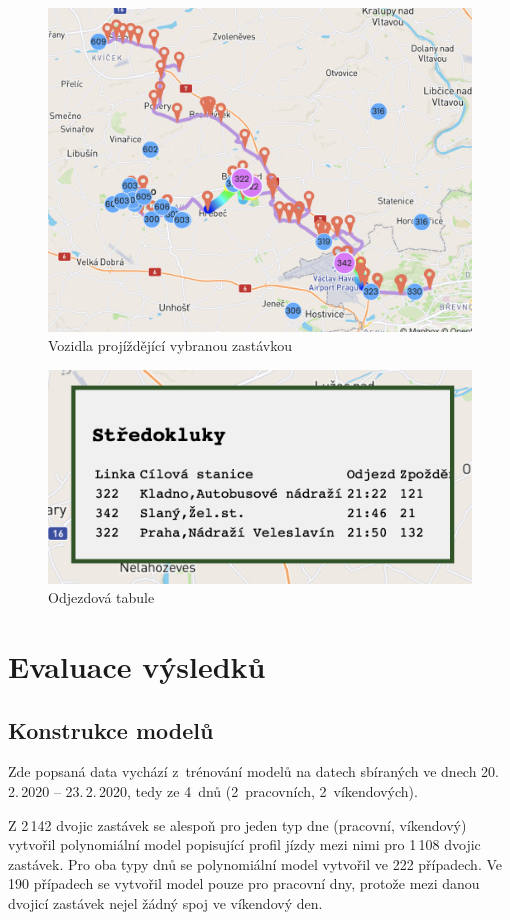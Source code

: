 \begin{figure}
   \centering
 \includegraphics[width=0.7\linewidth]{../img/more_trips.png}
 \caption{Vozidla projíždějící vybranou zastávkou}
 \label{fig:more_trips}
\end{figure}


\begin{figure}
   \centering
 \includegraphics[width=0.4\linewidth]{../img/stredokluky_table.png}
 \caption{Odjezdová tabule}
 \label{fig:stredokluky_table}
\end{figure}


\section{Evaluace výsledků}

\subsection{Konstrukce modelů}

Zde popsaná data vychází z~trénování modelů na datech sbíraných ve dnech 20.\,2.\,2020 -- 23.\,2.\,2020, tedy ze 4~dnů (2~pracovních, 2~víkendových).


\bigbreak

Z 2\,142 dvojic zastávek se alespoň pro jeden typ dne (pracovní, víkendový) vytvořil polynomiální model popisující profil jízdy mezi nimi pro 1\,108 dvojic zastávek. Pro oba typy dnů se polynomiální model vytvořil ve 222 případech. Ve 190 případech se vytvořil model pouze pro pracovní dny, protože mezi danou dvojicí zastávek nejel žádný spoj ve víkendový den.


